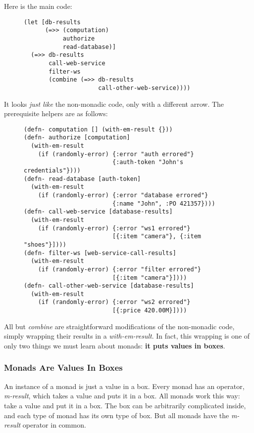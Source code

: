 \documentclass[11pt]{article}
\begin{document}
Here is the main code:
\begin{figure}[H]
\label{monadic-main}
\begin{verbatim}
(let [db-results
      (=>> (computation)
           authorize
           read-database)]
  (=>> db-results
       call-web-service
       filter-ws
       (combine (=>> db-results
                     call-other-web-service))))
\end{verbatim}
\end{figure}

It looks \emph{just like} the non-monadic code, only with a different
arrow. The prerequisite helpers are as follows:

\begin{figure}[H]
\label{monadic-helpers-1}
\begin{verbatim}
(defn- computation [] (with-em-result {}))
(defn- authorize [computation]
  (with-em-result
    (if (randomly-error) {:error "auth errored"}
                         {:auth-token "John's credentials"})))
(defn- read-database [auth-token]
  (with-em-result
    (if (randomly-error) {:error "database errored"}
                         {:name "John", :PO 421357})))
(defn- call-web-service [database-results]
  (with-em-result
    (if (randomly-error) {:error "ws1 errored"}
                         [{:item "camera"}, {:item "shoes"}])))
(defn- filter-ws [web-service-call-results]
  (with-em-result
    (if (randomly-error) {:error "filter errored"}
                         [{:item "camera"}])))
(defn- call-other-web-service [database-results]
  (with-em-result
    (if (randomly-error) {:error "ws2 errored"}
                         [{:price 420.00M}])))
\end{verbatim}
\end{figure}

All but \emph{combine} are straightforward modifications of the
non-monadic code, simply wrapping their results in a
\emph{with-em-result}. In fact, this wrapping is one of only two things
we must learn about monads: \textbf{it puts values in boxes}.

\subsubsection{Monads Are Values In Boxes}
\label{sec-3-2-1}

An instance of a monad is just a value in a box. Every monad has an
operator, \emph{m-result}, which takes a value and puts it in a
box. All monads work this way: take a value and put it in a box.
The box can be arbitrarily complicated inside, and each type of
monad has its own type of box. But all monads have the \emph{m-result}
operator in common.
\end{document}
